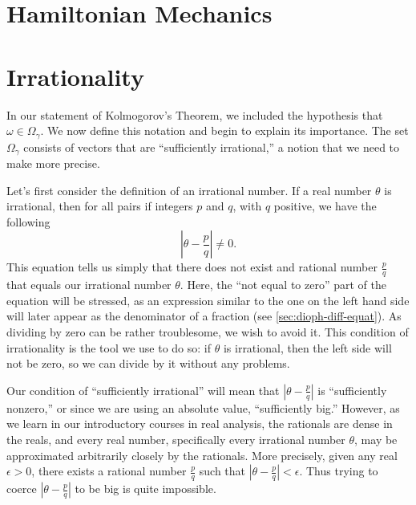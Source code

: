 \documentclass[twoside,letterpaper,10pt]{article}
\begin{document}

\section{Hamiltonian Mechanics}
\label{sec:hamilt-mech}



\section{Irrationality}
\label{sec:irrationality}

In our statement of Kolmogorov's Theorem, we included the hypothesis that
$\omega \in \Omega_{\gamma}$.
We now define this notation and begin to explain its importance.
The set $\Omega_{\gamma}$ consists of vectors that are ``sufficiently
irrational,'' a notion that we need to make more precise.

Let's first consider the definition of an irrational number.
If a real number $\theta$ is irrational, then for all pairs if integers $p$ and
$q$, with $q$ positive, we have the following
\begin{equation*}
  \left| \theta - \frac{p}{q} \right| \neq 0.
\end{equation*}
This equation tells us simply that there does not exist and rational number
$\frac{p}{q}$ that equals our irrational number $\theta$.
Here, the ``not equal to zero'' part of the equation will be stressed, as an
expression similar to the one on the left hand side will later appear as the
denominator of a fraction (see \cref{sec:dioph-diff-equat}).
As dividing by zero can be rather troublesome, we wish to avoid it.
This condition of irrationality is the tool we use to do so: if $\theta$ is
irrational, then the left side will not be zero, so we can divide by it without
any problems.

Our condition of ``sufficiently irrational'' will mean that $\left| \theta -
  \frac{p}{q} \right|$ is ``sufficiently nonzero,'' or since we are using an
absolute value, ``sufficiently big.''
However, as we learn in our introductory courses in real analysis, the rationals
are dense in the reals, and every real number, specifically every irrational
number $\theta$, may be approximated arbitrarily closely by the rationals.
More precisely, given any real $\epsilon > 0$, there exists a rational number
$\frac{p}{q}$ such that $\left| \theta - \frac{p}{q} \right| < \epsilon$.
Thus trying to coerce $\left| \theta - \frac{p}{q} \right|$ to be big is quite
impossible.
\end{document}
